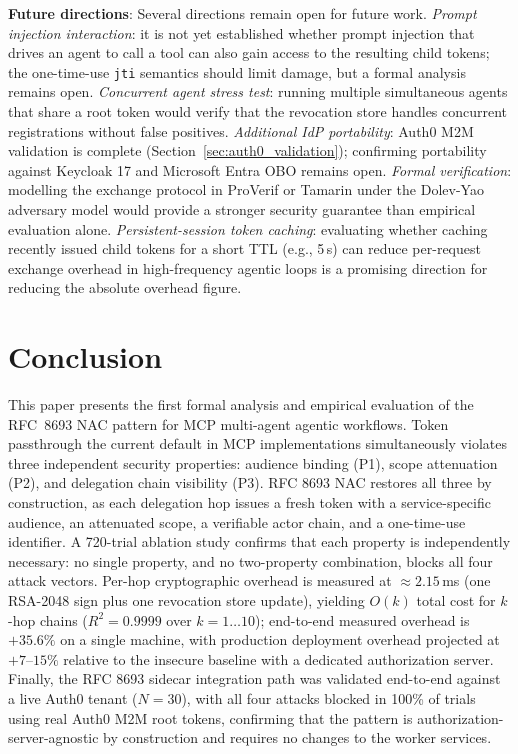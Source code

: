 \documentclass[journal]{IEEEtran}
\begin{document}
\textbf{Future directions}:
Several directions remain open for future work.
\textit{Prompt injection interaction}: it is not yet established whether prompt
injection that drives an agent to call a tool can also gain access to the
resulting child tokens; the one-time-use \texttt{jti} semantics should limit
damage, but a formal analysis remains open.
\textit{Concurrent agent stress test}: running multiple simultaneous agents that
share a root token would verify that the revocation store handles concurrent
registrations without false positives.
\textit{Additional IdP portability}: Auth0 M2M validation is complete
(Section~\ref{sec:auth0_validation}); confirming portability against Keycloak 17
and Microsoft Entra OBO remains open.
\textit{Formal verification}: modelling the exchange protocol in ProVerif
\cite{blanchet2001} or Tamarin \cite{meier2013} under the Dolev-Yao adversary
model would provide a stronger security guarantee than empirical evaluation alone.
\textit{Persistent-session token caching}: evaluating whether caching recently
issued child tokens for a short TTL (e.g., 5\,s) can reduce per-request exchange
overhead in high-frequency agentic loops is a promising direction for reducing
the absolute overhead figure.


\FloatBarrier  %

\section{Conclusion}
\label{sec:conclusion}

This paper presents the first formal analysis and empirical evaluation of the
RFC~8693 NAC pattern for MCP multi-agent agentic workflows. Token
passthrough the current default in MCP implementations simultaneously
violates three independent security properties: audience binding (P1), scope
attenuation (P2), and delegation chain visibility (P3). RFC 8693 NAC restores
all three by construction, as each delegation hop issues a fresh token with a
service-specific audience, an attenuated scope, a verifiable actor chain, and a
one-time-use identifier. A 720-trial ablation study confirms that each property
is independently necessary: no single property, and no two-property combination,
blocks all four attack vectors. Per-hop cryptographic overhead is measured at
$\approx 2.15$\,ms (one RSA-2048 sign plus one revocation store update),
yielding $O(k)$ total cost for $k$-hop chains ($R^2 = 0.9999$ over
$k=1\ldots10$); end-to-end measured overhead is $+35.6\%$ on a single machine,
with production deployment overhead projected at $+7$--$15\%$ relative to the
insecure baseline with a dedicated authorization server. Finally, the RFC 8693
sidecar integration path was validated end-to-end against a live Auth0 tenant
($N=30$), with all four attacks blocked in 100\% of trials using real Auth0 M2M
root tokens, confirming that the pattern is authorization-server-agnostic by
construction and requires no changes to the worker services.
\end{document}
